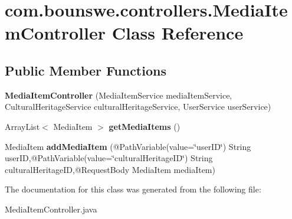 \hypertarget{classcom_1_1bounswe_1_1controllers_1_1MediaItemController}{}\section{com.\+bounswe.\+controllers.\+Media\+Item\+Controller Class Reference}
\label{classcom_1_1bounswe_1_1controllers_1_1MediaItemController}
\subsection*{Public Member Functions}
\begin{DoxyCompactItemize}
\item 
\hypertarget{classcom_1_1bounswe_1_1controllers_1_1MediaItemController_a450b0e313459a507bd78e8f090d2b305}{}{\bfseries Media\+Item\+Controller} (Media\+Item\+Service media\+Item\+Service, Cultural\+Heritage\+Service cultural\+Heritage\+Service, User\+Service user\+Service)\label{classcom_1_1bounswe_1_1controllers_1_1MediaItemController_a450b0e313459a507bd78e8f090d2b305}

\item 
\hypertarget{classcom_1_1bounswe_1_1controllers_1_1MediaItemController_a701cffcefc68eb0ce55acea2fe7a3ef2}{}Array\+List$<$ Media\+Item $>$ {\bfseries get\+Media\+Items} ()\label{classcom_1_1bounswe_1_1controllers_1_1MediaItemController_a701cffcefc68eb0ce55acea2fe7a3ef2}

\item 
\hypertarget{classcom_1_1bounswe_1_1controllers_1_1MediaItemController_a5ff0ea5ef44a0efe905f53f74d87ad17}{}Media\+Item {\bfseries add\+Media\+Item} (@Path\+Variable(value=\char`\"{}user\+I\+D\char`\"{}) String user\+I\+D,@Path\+Variable(value=\char`\"{}cultural\+Heritage\+I\+D\char`\"{}) String cultural\+Heritage\+I\+D,@Request\+Body Media\+Item media\+Item)\label{classcom_1_1bounswe_1_1controllers_1_1MediaItemController_a5ff0ea5ef44a0efe905f53f74d87ad17}

\end{DoxyCompactItemize}


The documentation for this class was generated from the following file\+:\begin{DoxyCompactItemize}
\item 
Media\+Item\+Controller.\+java\end{DoxyCompactItemize}

